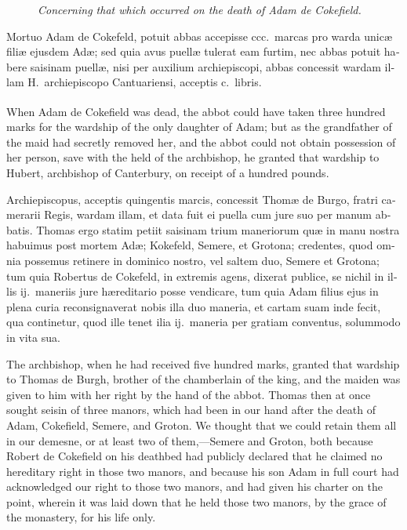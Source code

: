 \documentclass{book}
\newcounter{engnote}
\newcommand{\engnotenum}{\textsuperscript{\arabic{engnote}\stepcounter{engnote}}}
\newcommand{\engnotetext}[1]{\vphantom{\footnotemark{}}\footnotetext{#1}}
\newcommand{\blockhead}[4][]{
\begin{figure}
\centering
\vspace{#4}
\parbox{2.75cm}{\begin{center}\footnotesize \color{BrickRed} \emph{#2}\\ #1 \end{center}}
\end{figure}
}
\begin{document}
\begin{paracol}{2}
\switchcolumn*

\begin{otherlanguage}{latin}
\blockhead{Concerning that which occurred on the death of Adam de Cokefield.}{4}{-.45cm}
Mortuo Adam de Cokefeld,\engnotetext{Cp.\ note to p.\ \oldstylenums{153}.} potuit abbas accepisse ccc.\ marcas pro warda unic\ae{} fili\ae{} ejusdem Ad\ae{}; sed quia avus puell\ae{} tulerat eam furtim, nec abbas potuit habere saisinam puell\ae{}, nisi per auxilium archiepiscopi, abbas concessit wardam illam H.\ archiepiscopo Cantuariensi, acceptis c.\ libris.

\end{otherlanguage}

\switchcolumn

When Adam de Cokefield was dead,\engnotenum{} the abbot could have taken three hundred marks for the wardship of the only daughter of Adam; but as the grandfather of the maid had secretly removed her, and the abbot could not obtain possession of her person, save with the held of the archbishop, he granted that wardship to Hubert, archbishop of Canterbury, on receipt of a hundred pounds.

\switchcolumn*

\begin{otherlanguage}{latin}
Archiepiscopus, acceptis quingentis marcis, concessit Thom\ae{} de Burgo, fratri camerarii Regis, wardam illam, et data fuit ei puella cum jure suo per manum abbatis. Thomas ergo statim petiit saisinam trium maneriorum qu\ae{} in manu nostra habuimus post mortem Ad\ae{}; Kokefeld, Semere, et Grotona; credentes, quod omnia possemus retinere in dominico nostro, vel saltem duo, Semere et Grotona; tum quia Robertus de Cokefeld, in extremis agens, dixerat publice, se nichil in illis ij.\ maneriis jure h\ae{}reditario posse vendicare, tum quia Adam filius ejus in plena curia reconsignaverat nobis illa duo maneria, et cartam suam inde fecit, qua continetur, quod ille tenet ilia ij.\ maneria per gratiam conventus, solummodo in vita sua.
\end{otherlanguage}

\switchcolumn

The archbishop, when he had received five hundred marks, granted that wardship to Thomas de Burgh, brother of the chamberlain of the king, and the maiden was given to him with her right by the hand of the abbot. Thomas then at once sought seisin of three manors, which had been in our hand after the death of Adam, Cokefield, Semere, and Groton. We thought that we could retain them all in our demesne, or at least two of them,---Semere and Groton, both because Robert de Cokefield on his deathbed had publicly declared that he claimed no hereditary right in those two manors, and because his son Adam in full court had acknowledged our right to those two manors, and had given his charter on the point, wherein it was laid down that he held those two manors, by the grace of the monastery, for his life only.


\end{paracol}
\end{document}
